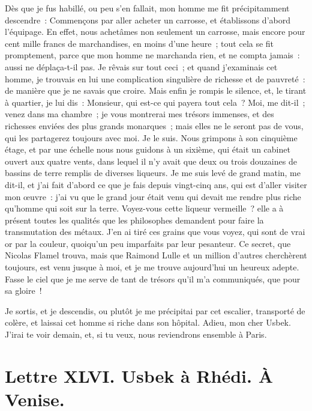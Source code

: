 \documentclass[french,twoside]{book} %
\newcommand{\dateline}[1]{\medskip{\RaggedLeft{#1}\par}\bigskip}
\begin{document}
Dès que je fus habillé, ou peu s’en fallait, mon homme me fit précipitamment descendre : Commençons par aller acheter un carrosse, et établissons d’abord l’équipage. En effet, nous achetâmes non seulement un carrosse, mais encore pour cent mille francs de marchandises, en moins d’une heure ; tout cela se fit promptement, parce que mon homme ne marchanda rien, et ne compta jamais : aussi ne déplaça-t-il pas. Je rêvais sur tout ceci ; et quand j’examinais cet homme, je trouvais en lui une complication singulière de richesse et de pauvreté : de manière que je ne savais que croire. Mais enfin je rompis le silence, et, le tirant à quartier, je lui dis : Monsieur, qui est-ce qui payera tout cela ? Moi, me dit-il ; venez dans ma chambre ; je vous montrerai mes trésors immenses, et des richesses enviées des plus grands monarques ; mais elles ne le seront pas de vous, qui les partagerez toujours avec moi. Je le suis. Nous grimpons à son cinquième étage, et par une échelle nous nous guidons à un sixième, qui était un cabinet ouvert aux quatre vents, dans lequel il n’y avait que deux ou trois douzaines de bassins de terre remplis de diverses liqueurs. Je me suis levé de grand matin, me dit-il, et j’ai fait d’abord ce que je fais depuis vingt-cinq ans, qui est d’aller visiter mon œuvre : j’ai vu que le grand jour était venu qui devait me rendre plus riche qu’homme qui soit sur la terre. Voyez-vous cette liqueur vermeille ? elle a à présent toutes les qualités que les philosophes demandent pour faire la transmutation des métaux. J’en ai tiré ces grains que vous voyez, qui sont de vrai or par la couleur, quoiqu’un peu imparfaits par leur pesanteur. Ce secret, que Nicolas Flamel trouva, mais que Raimond Lulle et un million d’autres cherchèrent toujours, est venu jusque à moi, et je me trouve aujourd’hui un heureux adepte. Fasse le ciel que je me serve de tant de trésors qu’il m’a communiqués, que pour sa gloire !\par
Je sortis, et je descendis, ou plutôt je me précipitai par cet escalier, transporté de colère, et laissai cet homme si riche dans son hôpital. Adieu, mon cher Usbek. J’irai te voir demain, et, si tu veux, nous reviendrons ensemble à Paris.\par

\dateline{À Paris, le dernier de la lune de Rhégeb, 1713.}
\section[{Lettre XLVI. Usbek à Rhédi. À Venise.}]{Lettre XLVI. Usbek à Rhédi. À Venise.}\renewcommand{\leftmark}{Lettre XLVI. Usbek à Rhédi. À Venise.}
\end{document}
